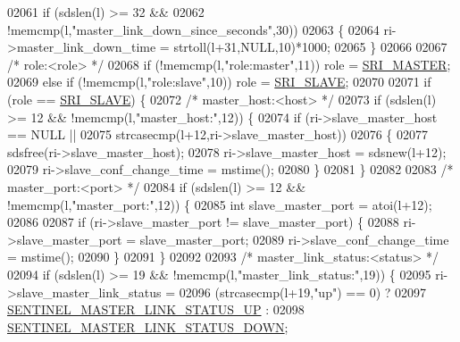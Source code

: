 \begin{DoxyCode}
{{{{{{{{{{{{{{{{{{{{{{{{{{{{{{{{{{{{{{{{{02061         \textcolor{keywordflow}{if} (sdslen(l) >= 32 &&
02062             !memcmp(l,\textcolor{stringliteral}{"master\_link\_down\_since\_seconds"},30))
02063         \{
02064             ri->master\_link\_down\_time = strtoll(l+31,NULL,10)*1000;
02065         \}
02066 
02067         \textcolor{comment}{/* role:<role> */}
02068         \textcolor{keywordflow}{if} (!memcmp(l,\textcolor{stringliteral}{"role:master"},11)) role = \hyperlink{sentinel_8c_a2ee83e5ff67b45746cd6a310f15334b2}{SRI\_MASTER};
02069         \textcolor{keywordflow}{else} \textcolor{keywordflow}{if} (!memcmp(l,\textcolor{stringliteral}{"role:slave"},10)) role = \hyperlink{sentinel_8c_a4b9db21eda79d49bd9fdf2cf7b3178e8}{SRI\_SLAVE};
02070 
02071         \textcolor{keywordflow}{if} (role == \hyperlink{sentinel_8c_a4b9db21eda79d49bd9fdf2cf7b3178e8}{SRI\_SLAVE}) \{
02072             \textcolor{comment}{/* master\_host:<host> */}
02073             \textcolor{keywordflow}{if} (sdslen(l) >= 12 && !memcmp(l,\textcolor{stringliteral}{"master\_host:"},12)) \{
02074                 \textcolor{keywordflow}{if} (ri->slave\_master\_host == NULL ||
02075                     strcasecmp(l+12,ri->slave\_master\_host))
02076                 \{
02077                     sdsfree(ri->slave\_master\_host);
02078                     ri->slave\_master\_host = sdsnew(l+12);
02079                     ri->slave\_conf\_change\_time = mstime();
02080                 \}
02081             \}
02082 
02083             \textcolor{comment}{/* master\_port:<port> */}
02084             \textcolor{keywordflow}{if} (sdslen(l) >= 12 && !memcmp(l,\textcolor{stringliteral}{"master\_port:"},12)) \{
02085                 \textcolor{keywordtype}{int} slave\_master\_port = atoi(l+12);
02086 
02087                 \textcolor{keywordflow}{if} (ri->slave\_master\_port != slave\_master\_port) \{
02088                     ri->slave\_master\_port = slave\_master\_port;
02089                     ri->slave\_conf\_change\_time = mstime();
02090                 \}
02091             \}
02092 
02093             \textcolor{comment}{/* master\_link\_status:<status> */}
02094             \textcolor{keywordflow}{if} (sdslen(l) >= 19 && !memcmp(l,\textcolor{stringliteral}{"master\_link\_status:"},19)) \{
02095                 ri->slave\_master\_link\_status =
02096                     (strcasecmp(l+19,\textcolor{stringliteral}{"up"}) == 0) ?
02097                     \hyperlink{sentinel_8c_a8dc7f6cce8e6299e2422b8c65ca16418}{SENTINEL\_MASTER\_LINK\_STATUS\_UP} :
02098                     \hyperlink{sentinel_8c_af4e90431bc568a5b3be300ecebc064d6}{SENTINEL\_MASTER\_LINK\_STATUS\_DOWN};
}}}}}}}}}}}}}}}}}}}}}}}}}}}}}}}}}}}}}}}}}
\end{DoxyCode}
